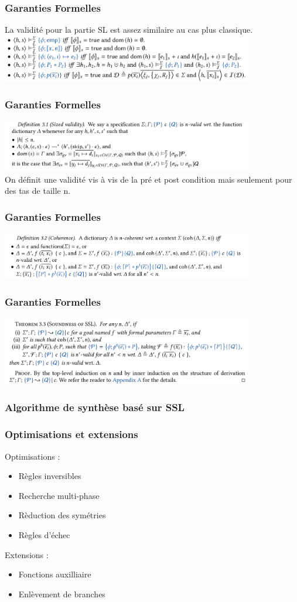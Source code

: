 \documentclass[french]{beamer}
\begin{document}
\begin{frame}[fragile]
	\frametitle{Garanties Formelles}
	La validité pour la partie SL est assez similaire au cas plus classique.\\
	\vspace{0.5cm}
	\includegraphics[width=11cm]{figures/satisfaction.png}
\end{frame}
\begin{frame}[fragile]
	\frametitle{Garanties Formelles}
	\includegraphics[width=11cm]{figures/nvalid.png}\\
	
	On définit une validité vis à vis de la pré et post condition mais seulement pour des tas de taille n.
\end{frame}
\begin{frame}[fragile]
	\frametitle{Garanties Formelles}
	\includegraphics[width=11cm]{figures/coherence.png}
\end{frame}
\begin{frame}[fragile]
	\frametitle{Garanties Formelles}
	\includegraphics[width=11cm]{figures/thm.png}
\end{frame}
\begin{frame}[fragile]
	\frametitle{Algorithme de synthèse basé sur SSL}
\end{frame}
\begin{frame}[fragile]
	\frametitle{Optimisations et extensions}
	Optimisations :
	\begin{itemize}
		\item Règles inversibles
		\pause
		\item Recherche multi-phase
		\pause
		\item Rèduction des symétries
		\pause
		\item Règles d'échec 
	\end{itemize}
	\pause
	Extensions :
	\begin{itemize}
	\item Fonctions auxilliaire
	\pause
	\item Enlèvement de branches	
	\end{itemize}
\end{frame}
\end{document}
